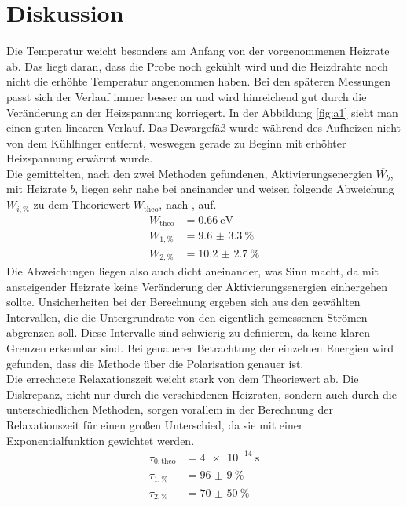 \section{Diskussion}


Die Temperatur weicht besonders am Anfang von der vorgenommenen Heizrate ab. Das liegt daran, dass die Probe noch
gekühlt wird und die Heizdrähte noch nicht die erhöhte Temperatur angenommen haben. Bei den späteren Messungen passt sich der Verlauf immer besser an
und wird hinreichend gut durch die Veränderung an der Heizspannung korriegert. In der Abbildung \ref{fig:a1} sieht man einen guten linearen Verlauf.
Das Dewargefäß wurde während des Aufheizen nicht von dem Kühlfinger entfernt, weswegen gerade zu Beginn mit erhöhter Heizspannung erwärmt wurde.
\\
\newline
Die gemittelten, nach den zwei Methoden gefundenen, Aktivierungsenergien $\overline{W_{b}}$, mit Heizrate $b$,  liegen sehr nahe bei aneinander und weisen folgende Abweichung $W_{i,\%}$ zu dem Theoriewert $W_{\text{theo}}$, nach \cite{https://doi.org/10.1002/pssb.2220610223}, auf.
\begin{align*}
    W_{\text{theo}} &= \SI{0.66}{\electronvolt} \\
    W_{1,\%} &= \SI{9.6(33)}{\percent}  \\
    W_{2,\%} &= \SI{10.2(27)}{\percent}
\end{align*}
Die Abweichungen liegen also auch dicht aneinander, was Sinn macht, da mit ansteigender Heizrate keine Veränderung der Aktivierungsenergien einhergehen sollte.
Unsicherheiten bei der Berechnung ergeben sich aus den gewählten Intervallen, die die Untergrundrate von den eigentlich gemessenen Strömen abgrenzen soll.
Diese Intervalle sind schwierig zu definieren, da keine klaren Grenzen erkennbar sind.
Bei genauerer Betrachtung der einzelnen Energien wird gefunden, dass die Methode über die Polarisation genauer ist.
\\
\newline
Die errechnete Relaxationszeit weicht stark von dem Theoriewert ab.  
Die Diskrepanz, nicht nur durch die verschiedenen Heizraten, sondern auch durch die unterschiedlichen Methoden, sorgen vorallem 
in der Berechnung der Relaxationszeit für einen großen Unterschied, da sie mit einer Exponentialfunktion gewichtet werden.
\begin{align*}
    \tau_{0,\text{theo}} &= \SI{4e-14}{\second} \\
    \tau_{1,\%} &= \SI{96(9)}{\percent}  \\
    \tau_{2,\%} &= \SI{70(50)}{\percent}
\end{align*}
